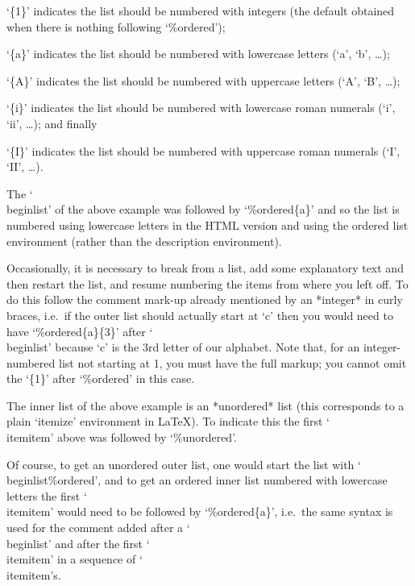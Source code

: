 \beginlist
\item{`\{1\}'}
indicates the list should be numbered with integers (the default obtained
when there is nothing following `\%ordered');

\item{`\{a\}'}
indicates the list should be numbered with lowercase letters (`a', `b',
\dots);

\item{`\{A\}'}
indicates the list should be numbered with uppercase letters (`A', `B',
\dots);

\item{`\{i\}'}
indicates the list should be numbered with lowercase roman numerals (`i', `ii',
\dots); and finally

\item{`\{I\}'}
indicates the list should be numbered with uppercase roman numerals (`I', `II',
\dots).

\endlist

The `\\beginlist' of the above example was followed by `\%ordered\{a\}' and
so the list is numbered using lowercase letters in the HTML version and using
the ordered list environment (rather than the description environment). 

Occasionally, it is necessary to break from a list, add some explanatory
text and then restart the list, and resume numbering the items from where
you left off. To do this follow the comment mark-up already mentioned by an
*integer* in curly braces, i.e.~if the outer list should actually start at
`c' then you would need to have `\%ordered\{a\}\{3\}' after `\\beginlist'
because `c' is the 3rd letter of our alphabet. Note that, for an
integer-numbered list not starting at 1, you must have the full markup; you
cannot omit the `\{1\}' after `\%ordered' in this case.

The inner list of the above example is an *unordered* list (this corresponds
to a plain `itemize' environment in La{\TeX}). To indicate this the first
`\\itemitem' above was followed by `\%unordered'.

Of course, to get an unordered outer list, one would start the list with
`\\beginlist\%ordered', and to get an ordered inner list numbered with
lowercase letters the first `\\itemitem' would need to be followed by
`\%ordered\{a\}', i.e.~the same syntax is used for the comment added after
a `\\beginlist' and after the first `\\itemitem' in a sequence of
`\\itemitem's.

